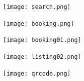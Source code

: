 \documentclass[12pt]{beamer}
\begin{document}
{    \begin{frame}
        \begin{center}
            \texttt{[image: search.png]}
        \end{center}
    \end{frame}

    \begin{frame}
        \begin{center}
            \texttt{[image: booking.png]}
        \end{center}
    \end{frame}

    \begin{frame}
        \begin{center}
            \texttt{[image: booking01.png]}
        \end{center}
    \end{frame}

    \begin{frame}
        \begin{center}
            \texttt{[image: listing02.png]}
        \end{center}
    \end{frame}
}

\begin{frame}

        \begin{center}
            \texttt{[image: qrcode.png]}
        \end{center}
    \end{frame}
\end{document}
